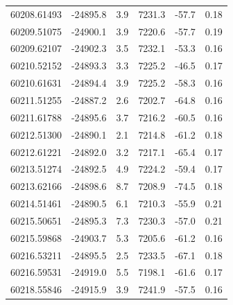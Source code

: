 \documentclass[fleqn,usenatbib,useAMS]{mnras}
\begin{document}
\begin{table}
\begin{tabular}[t]{cccccc}
60208.61493 & -24895.8 & 3.9 & 7231.3 & -57.7 & 0.18\\ 
60209.51075 & -24900.1 & 3.9 & 7220.6 & -57.7 & 0.19\\ 
60209.62107 & -24902.3 & 3.5 & 7232.1 & -53.3 & 0.16\\ 
60210.52152 & -24893.3 & 3.3 & 7225.2 & -46.5 & 0.17\\ 
60210.61631 & -24894.4 & 3.9 & 7225.2 & -58.3 & 0.16\\ 
60211.51255 & -24887.2 & 2.6 & 7202.7 & -64.8 & 0.16\\ 
60211.61788 & -24895.6 & 3.7 & 7216.2 & -60.5 & 0.16\\ 
60212.51300 & -24890.1 & 2.1 & 7214.8 & -61.2 & 0.18\\ 
60212.61221 & -24892.0 & 3.2 & 7217.1 & -65.4 & 0.17\\ 
60213.51274 & -24892.5 & 4.9 & 7224.2 & -59.4 & 0.17\\ 
60213.62166 & -24898.6 & 8.7 & 7208.9 & -74.5 & 0.18\\ 
60214.51461 & -24890.5 & 6.1 & 7210.3 & -55.9 & 0.21\\ 
60215.50651 & -24895.3 & 7.3 & 7230.3 & -57.0 & 0.21\\ 
60215.59868 & -24903.7 & 5.3 & 7205.6 & -61.2 & 0.16\\ 
60216.53211 & -24895.5 & 2.5 & 7233.5 & -67.1 & 0.18\\ 
60216.59531 & -24919.0 & 5.5 & 7198.1 & -61.6 & 0.17\\ 
60218.55846 & -24915.9 & 3.9 & 7241.9 & -57.5 & 0.16\\
   \hline
 \end{tabular}
\end{table}
\end{document}
